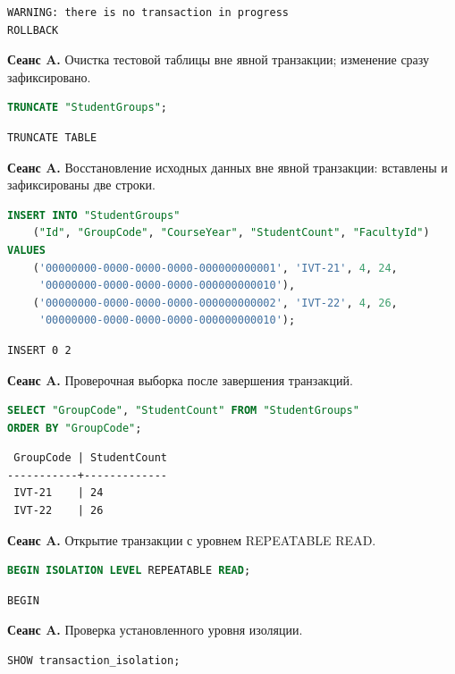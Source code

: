 \documentclass[12pt,a4paper]{article}
\begin{document}
\begin{lstlisting}
WARNING: there is no transaction in progress
ROLLBACK
\end{lstlisting}

\textbf{Сеанс A.} Очистка тестовой таблицы вне явной транзакции; изменение сразу зафиксировано.
\begin{lstlisting}[language=SQL]
TRUNCATE "StudentGroups";
\end{lstlisting}

\begin{lstlisting}
TRUNCATE TABLE
\end{lstlisting}

\textbf{Сеанс A.} Восстановление исходных данных вне явной транзакции: вставлены и зафиксированы две строки.
\begin{lstlisting}[language=SQL]
INSERT INTO "StudentGroups"
    ("Id", "GroupCode", "CourseYear", "StudentCount", "FacultyId")
VALUES
    ('00000000-0000-0000-0000-000000000001', 'IVT-21', 4, 24,
     '00000000-0000-0000-0000-000000000010'),
    ('00000000-0000-0000-0000-000000000002', 'IVT-22', 4, 26,
     '00000000-0000-0000-0000-000000000010');
\end{lstlisting}

\begin{lstlisting}
INSERT 0 2
\end{lstlisting}

\textbf{Сеанс A.} Проверочная выборка после завершения транзакций.
\begin{lstlisting}[language=SQL]
SELECT "GroupCode", "StudentCount" FROM "StudentGroups"
ORDER BY "GroupCode";
\end{lstlisting}

\begin{lstlisting}
 GroupCode | StudentCount
-----------+-------------
 IVT-21    | 24
 IVT-22    | 26
\end{lstlisting}

\textbf{Сеанс A.} Открытие транзакции с уровнем REPEATABLE READ.
\begin{lstlisting}[language=SQL]
BEGIN ISOLATION LEVEL REPEATABLE READ;
\end{lstlisting}

\begin{lstlisting}
BEGIN
\end{lstlisting}

\textbf{Сеанс A.} Проверка установленного уровня изоляции.
\begin{lstlisting}[language=SQL]
SHOW transaction_isolation;
\end{lstlisting}
\end{document}
